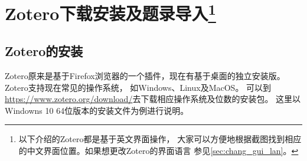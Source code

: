 \documentclass[cn,11pt,chinese]{elegantbook}
\begin{document}
\tableofcontents

\mainmatter
\chapter[Zotero下载安装及题录导入]{Zotero下载安装及题录导入\footnote{以下介绍的Zotero都是基于英文界面操作，
  		大家可以方便地根据截图找到相应的中文界面位置。如果想更改Zotero的界面语言
		  参见\cref{sec:chang_gui_lan}。}}\label{ch:install}
	\section{Zotero的安装} 
		Zotero原来是基于Firefox浏览器的一个插件，现在有基于桌面的独立安装版。Zotero支持现在常见的操作系统，
		如Windows、Linux及MacOS。
		可以到\url{https://www.zotero.org/download/}去下载相应操作系统及位数的安装包。
		这里以Windowns 10 64位版本的安装文件为例进行说明。
\end{document}

